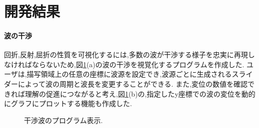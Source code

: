 \documentclass[a4j,twocolumn,uplatex]{jarticle}
\begin{document}
\vspace{-2em}
\section{開発結果}
\vspace{-0.5em}
\paragraph{波の干渉}
回折,反射,屈折の性質を可視化するには,多数の波が干渉する様子を忠実に再現しなければならないため,図\ref{fig:program1}(a)の波の干渉を視覚化するプログラムを作成した. ユーザは,描写領域上の任意の座標に波源を設定でき,波源ごとに生成されるスライダーによって波の周期と波長を変更することができる.
また,変位の数値を確認できれば理解の促進につながると考え,図\ref{fig:program1}(b)の,指定したy座標での波の変位を動的にグラフにプロットする機能も作成した.

\begin{figure}[H]
\caption{{\footnotesize 干渉波のプログラム表示.}}
\label{fig:program1}
\end{figure}
\end{document}
